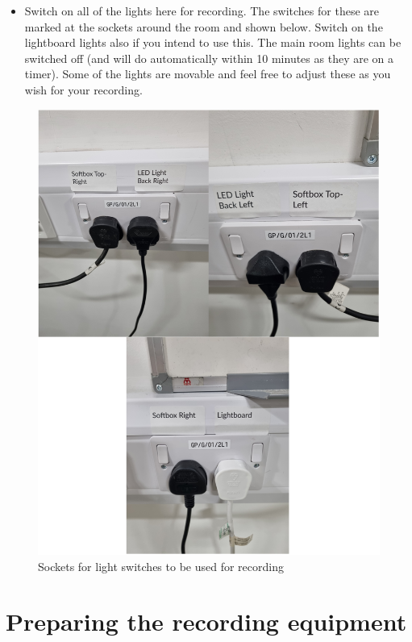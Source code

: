 \documentclass[
]{book}
\providecommand{\tightlist}{%
  \setlength{\itemsep}{0pt}\setlength{\parskip}{0pt}}
\begin{document}
\begin{itemize}
\tightlist
\item
  Switch on all of the lights here for recording. The switches for these are marked at the sockets around the room and shown below. Switch on the lightboard lights also if you intend to use this. The main room lights can be switched off (and will do automatically within 10 minutes as they are on a timer). Some of the lights are movable and feel free to adjust these as you wish for your recording.
\end{itemize}

\begin{figure}

{\centering \includegraphics[width=1\linewidth]{Light_switches} 

}

\caption{Sockets for light switches to be used for recording}\label{fig:lightswitch}
\end{figure}

\hypertarget{preparing-the-recording-equipment}{%
\section{Preparing the recording equipment}\label{preparing-the-recording-equipment}}
\end{document}
